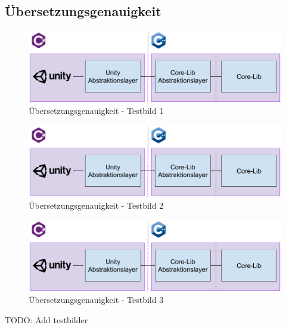 \subsection{Übersetzungsgenauigkeit}\label{anhang:uebersetzungsgenauigkeit:testbilder}
\begin{figure}[h!]
    \begin{center}
        \includegraphics[width=0.8\linewidth]{../common/07_appendix/resources/01_translation/00_translation_testbild_1.png}
    \end{center}
    \caption{Übersetzungsgenauigkeit - Testbild 1}
    \label{fig:uebersetzungsgenauigkeit:testbild:1}
\end{figure}
\begin{figure}[h!]
    \begin{center}
        \includegraphics[width=0.8\linewidth]{../common/07_appendix/resources/01_translation/00_translation_testbild_1.png}
    \end{center}
    \caption{Übersetzungsgenauigkeit - Testbild 2}
    \label{fig:uebersetzungsgenauigkeit:testbild:2}
\end{figure}
\begin{figure}[h!]
    \begin{center}
        \includegraphics[width=0.8\linewidth]{../common/07_appendix/resources/01_translation/00_translation_testbild_1.png}
    \end{center}
    \caption{Übersetzungsgenauigkeit - Testbild 3}
    \label{fig:uebersetzungsgenauigkeit:testbild:3}
\end{figure}
TODO: Add testbilder